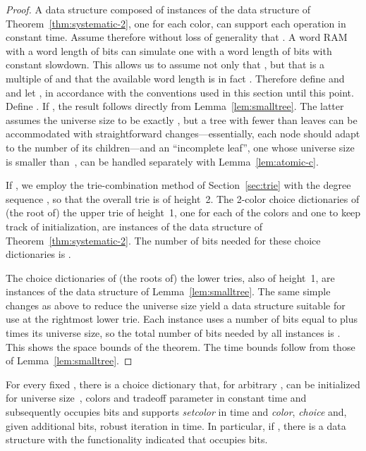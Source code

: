 \documentclass[envcountsame,envcountsect,undated,nolinenumbers]{lnthi}
\def\Tvn#1{\hbox{\textit{#1\/}}}
\begin{document}
\begin{proof}
A data structure composed of  instances of
the data structure of Theorem~\ref{thm:systematic-2},
one for each color, can support each
operation in constant time.
Assume therefore without loss of generality that
.
A word RAM with a word length of  bits
can simulate one with a word length of  bits
with constant slowdown.
This allows us to assume not only that
, but that  is a multiple of 
and that
the available
word length is in fact .
Therefore define
 and 
and let , in accordance
with the conventions used in this
section until this point.
Define .
If , the result follows directly from
Lemma~\ref{lem:smalltree}.
The latter assumes the universe size to be
exactly , but a tree with fewer than
 leaves
can be accommodated with straightforward
changes---essentially, each node should
adapt to
the number of its children---and
an ``incomplete leaf'',
one whose universe size is smaller than~,
can be handled separately with
Lemma~\ref{lem:atomic-c}.

If , we employ the trie-combination method of
Section~\ref{sec:trie} with
the degree sequence ,
so that the overall trie is of height~2.
The 2-color choice dictionaries
of (the root of) the upper trie of height~1,
one for each of the  colors and one
to keep track of initialization, are
instances of the data structure of
Theorem~\ref{thm:systematic-2}.
The number of bits needed
for these choice dictionaries is
.

The choice dictionaries of (the roots of) the
lower tries, also of height~1,
are instances of the data
structure of Lemma~\ref{lem:smalltree}.
The same simple changes as above to reduce the
universe size yield a data structure
suitable for use at the rightmost lower trie.
Each instance uses 
a number of bits equal to  plus
 times its universe size, so the total
number of bits needed by all instances is .
This shows the space bounds of the theorem.
The time bounds follow from those of
Lemma~\ref{lem:smalltree}.
\end{proof}

\begin{theorem}
\label{thm:unsystematic-f}For every fixed ,
there is a choice dictionary that, for
arbitrary ,
can be initialized for universe size~,
 colors and tradeoff parameter 
in constant time and subsequently occupies
 bits
and supports
\Tvn{setcolor} in  time and
\Tvn{color}, \Tvn{choice} and,
given  additional bits,
robust iteration in  time.
In particular, if ,
there is a data structure with the functionality
indicated that occupies
 bits.
\end{theorem}
\end{document}
